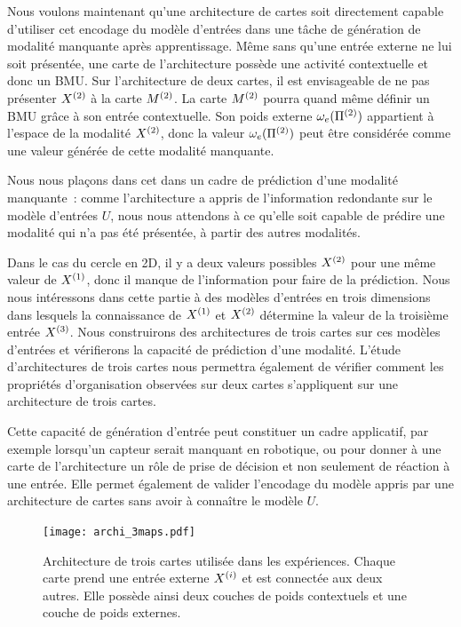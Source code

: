 \documentclass[../main]{subfiles}
\begin{document}
Nous voulons maintenant qu'une architecture de cartes soit directement capable d'utiliser cet encodage du modèle d'entrées dans une tâche de génération de modalité manquante après apprentissage.
Même sans qu'une entrée externe ne lui soit présentée, une carte de l'architecture possède une activité contextuelle et donc un BMU. 
Sur l'architecture de deux cartes, il est envisageable de ne pas présenter $X^{({2})}$ à la carte $M^{({2})}$. La carte $M^{({2})}$ pourra quand même définir un BMU grâce à son entrée contextuelle. 
Son poids externe $\omega_e(\Pi^{({2})})$ appartient à l'espace de la modalité $X^{({2})}$, donc la valeur $\omega_e(\Pi^{({2})})$ peut être considérée comme une valeur générée de cette modalité manquante.

Nous nous plaçons dans cet dans un cadre de prédiction d'une modalité manquante~: comme l'architecture a appris de l'information redondante sur le modèle d'entrées $U$, nous nous attendons à ce qu'elle soit capable de prédire une modalité qui n'a pas été présentée, à partir des autres modalités.

Dans le cas du cercle en 2D, il y a deux valeurs possibles $X^{({2})}$ pour une même valeur de $X^{({1})}$, donc il manque de l'information pour faire de la prédiction. Nous nous intéressons dans cette partie à des modèles d'entrées en trois dimensions dans lesquels la connaissance de $X^{({1})}$ et $X^{({2})}$ détermine la valeur de la troisième entrée $X^{({3})}$. 
Nous construirons des architectures de trois cartes sur ces modèles d'entrées et vérifierons la capacité de prédiction d'une modalité.
L'étude d'architectures de trois cartes nous permettra également de vérifier comment les propriétés d'organisation observées sur deux cartes s'appliquent sur une architecture de trois cartes.

Cette capacité de génération d'entrée peut constituer un cadre applicatif, par exemple lorsqu'un capteur serait manquant en robotique, ou pour donner à une carte de l'architecture un rôle de prise de décision et non seulement de réaction à une entrée. Elle permet également de valider l'encodage du modèle appris par une architecture de cartes sans avoir à connaître le modèle $U$.

\begin{figure}
	\centering\texttt{[image: archi\_3maps.pdf]}
	\vspace{-0.5cm}
	\caption{Architecture de trois cartes utilisée dans les expériences. Chaque carte prend une entrée externe $X^{({i})}$ et est connectée aux deux autres. Elle possède ainsi deux couches de poids contextuels et une couche de poids externes.\label{fig:archi_3maps}}
\end{figure}
\end{document}
